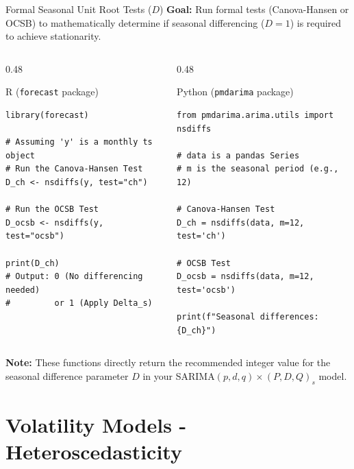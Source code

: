 \documentclass[aspectratio=169]{beamer}
\begin{document}
\begin{frame}[fragile]{Formal Seasonal Unit Root Tests ($D$)}
\small
\textbf{Goal:} Run formal tests (Canova-Hansen or OCSB) to mathematically determine if seasonal differencing ($D=1$) is required to achieve stationarity.

\vspace{0.2cm}

\begin{columns}[T]
\begin{column}{0.48\textwidth}
\begin{block}{R (\texttt{forecast} package)}
\begin{verbatim}
library(forecast)

# Assuming 'y' is a monthly ts object
# Run the Canova-Hansen Test
D_ch <- nsdiffs(y, test="ch")

# Run the OCSB Test
D_ocsb <- nsdiffs(y, test="ocsb")

print(D_ch)
# Output: 0 (No differencing needed) 
#         or 1 (Apply Delta_s)
\end{verbatim}
\end{block}
\end{column}

\begin{column}{0.48\textwidth}
\begin{block}{Python (\texttt{pmdarima} package)}
\begin{verbatim}
from pmdarima.arima.utils import nsdiffs

# data is a pandas Series
# m is the seasonal period (e.g., 12)

# Canova-Hansen Test
D_ch = nsdiffs(data, m=12, test='ch')

# OCSB Test
D_ocsb = nsdiffs(data, m=12, test='ocsb')

print(f"Seasonal differences: {D_ch}")
\end{verbatim}
\end{block}
\end{column}
\end{columns}
\end{frame}
\begin{frame}
\vspace{0.3cm}
\textbf{Note:} These functions directly return the recommended integer value for the seasonal difference parameter $D$ in your SARIMA$(p,d,q) \times (P,D,Q)_s$ model.
\end{frame}

\section{Volatility Models - Heteroscedasticity}
\end{document}
